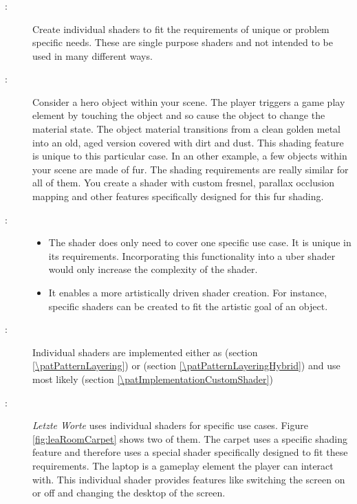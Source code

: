 \subsubsection{\patWorkflowIndividualShader}\label{\patWorkflowIndividualShader}
\begin{description}
	\item[\patIntent:]%
	Create individual shaders to fit the requirements of unique or problem specific needs. These are single purpose shaders and not intended to be used in many different ways. 
	\item[\patMotivation:]%
	Consider a hero object within your scene. The player triggers a game play element by touching the object and so cause the object to change the material state. The object material transitions from a clean golden metal into an old, aged version covered with dirt and dust. This shading feature is unique to this particular case. In an other example, a few objects within your scene are made of fur. The shading requirements are really similar for all of them. You create a shader with custom fresnel, parallax occlusion mapping and other features specifically designed for this fur shading.
	\item[\patApplicability:]\hfill
	\begin{itemize}\mynobreakpar
		\item The shader does only need to cover one specific use case. It is unique in its requirements. Incorporating this functionality into a uber shader would only increase the complexity of the shader.
		\item It enables a more artistically driven shader creation. For instance, specific shaders can be created to fit the artistic goal of an object.
	\end{itemize}
	\item[\patImplementation:]%
	Individual shaders are implemented either as \emph{\patPatternLayering} (section \ref{\patPatternLayering}) or \emph{\patPatternLayeringHybrid} (section \ref{\patPatternLayeringHybrid}) and use most likely \emph{\patImplementationCustomShader} (section \ref{\patImplementationCustomShader})
	\item[\patExamples:]%
	\emph{Letzte Worte} uses individual shaders for specific use cases. Figure \ref{fig:leaRoomCarpet} shows two of them. The carpet uses a specific shading feature and therefore uses a special shader specifically designed to fit these requirements. The laptop is a gameplay element the player can interact with. This individual shader provides features like switching the screen on or off and changing the desktop of the screen. 

\end{description}
